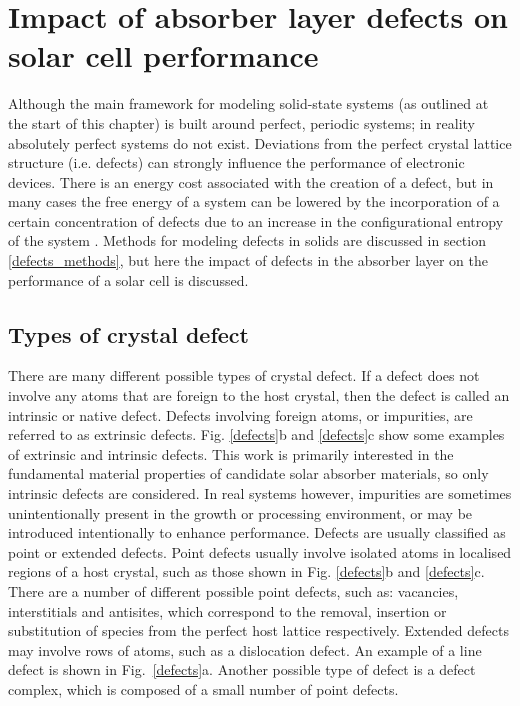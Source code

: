 \documentclass[11pt, twoside]{report}
\begin{document}
\section{Impact of absorber layer defects on solar cell performance}\label{defects_impact}
Although the main framework for modeling solid-state systems (as outlined at the start of this chapter) is built around perfect, periodic systems; in reality absolutely perfect systems do not exist. Deviations from the perfect crystal lattice structure (i.e. defects) can strongly influence the performance of electronic devices. There is an energy cost associated with the creation of a defect, but in many cases the free energy of a system can be lowered by the incorporation of a certain concentration of defects due to an increase in the configurational entropy of the system \cite{AshcroftMermin_general}. Methods for modeling defects in solids are discussed in section \ref{defects_methods}, but here the impact of defects in the absorber layer on the performance of a solar cell is discussed.

\subsection{Types of crystal defect}

There are many different possible types of crystal defect. If a defect does not involve any atoms that are foreign to the host crystal, then the defect is called an intrinsic or native defect. Defects involving foreign atoms, or impurities, are referred to as extrinsic defects. Fig. \ref{defects}b and \ref{defects}c show some examples of extrinsic and intrinsic defects. This work is primarily interested in the fundamental material properties of candidate solar absorber materials, so only intrinsic defects are considered. In real systems however, impurities are sometimes unintentionally present in the growth or processing environment, or may be introduced intentionally to enhance performance.
Defects are usually classified as point or extended defects. Point defects usually involve isolated atoms in localised regions of a host crystal, such as those shown in Fig. \ref{defects}b and \ref{defects}c. There are a number of different possible point defects, such as: vacancies, interstitials and antisites, which correspond to the removal, insertion or substitution of species from the perfect host lattice respectively. Extended defects may involve rows of atoms, such as a dislocation defect. An example of a line defect is shown in Fig.~\ref{defects}a. Another possible type of defect is a defect complex, which is composed of a small number of point defects.
\end{document}

